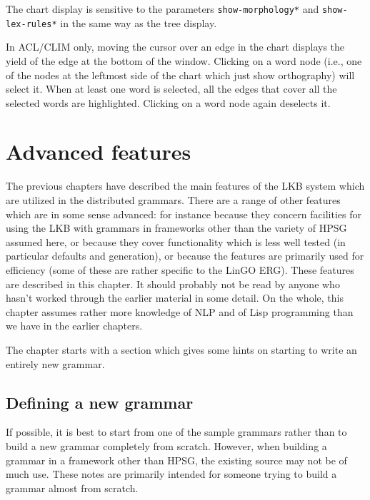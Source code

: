 \documentclass[12pt]{report}
\newcommand{\lkbparam}[1]{{\tt #1}}
\begin{document}
The chart display is sensitive to the parameters 
\lkbparam{*show-morphology*} and \lkbparam{*show-lex-rules*}
in the same way as the tree display.

In ACL/CLIM only, 
moving the cursor over an edge in the chart displays the yield of the edge
at the bottom of the window.  Clicking on a word node (i.e.,
one of the nodes at the leftmost side of the
chart which just show orthography) will select it.  
When at least one word is
selected, all the edges that cover all the selected words are highlighted.
Clicking on a word node again deselects it.

\chapter{Advanced features}
\label{advanced}

The previous chapters have described the main features of the LKB 
system which are utilized in the distributed grammars.
There are a range of other features which are in some sense
advanced: for instance because they concern facilities for using the
LKB with grammars in frameworks other than
the variety of HPSG assumed here, 
or because they cover functionality which is less well
tested (in particular defaults and generation), or because 
the features are primarily used for efficiency (some of these are
rather specific to the LinGO ERG).
These features are described in this chapter.
It should probably not be read by anyone who hasn't worked through
the earlier material in some detail.
On the whole, this chapter assumes rather more knowledge of 
NLP and of Lisp programming than we have in the earlier chapters.

The chapter starts with a section which gives some hints on 
starting to write an entirely new grammar.

\section{Defining a new grammar}
\label{own}

If possible, it is best to start from one of the sample grammars
rather than to build a new grammar completely from scratch.
However, when building a grammar in a framework other than 
HPSG, the existing source may not be of much use.
These notes are primarily intended for someone
trying to build a grammar almost from scratch.
\end{document}
